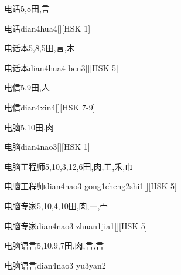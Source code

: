 \begin{Entry}{电话}{5,8}{⽥,⾔}
  \begin{Phonetics}{电话}{dian4hua4}[][HSK 1]
  \end{Phonetics}
\end{Entry}

\begin{Entry}{电话本}{5,8,5}{⽥,⾔,⽊}
  \begin{Phonetics}{电话本}{dian4hua4 ben3}[][HSK 5]
  \end{Phonetics}
\end{Entry}

\begin{Entry}{电信}{5,9}{⽥,⼈}
  \begin{Phonetics}{电信}{dian4xin4}[][HSK 7-9]
  \end{Phonetics}
\end{Entry}

\begin{Entry}{电脑}{5,10}{⽥,⾁}
  \begin{Phonetics}{电脑}{dian4nao3}[][HSK 1]
  \end{Phonetics}
\end{Entry}

\begin{Entry}{电脑工程师}{5,10,3,12,6}{⽥,⾁,⼯,⽲,⼱}
  \begin{Phonetics}{电脑工程师}{dian4nao3 gong1cheng2shi1}[][HSK 5]
  \end{Phonetics}
\end{Entry}

\begin{Entry}{电脑专家}{5,10,4,10}{⽥,⾁,⼀,⼧}
  \begin{Phonetics}{电脑专家}{dian4nao3 zhuan1jia1}[][HSK 5]
  \end{Phonetics}
\end{Entry}

\begin{Entry}{电脑语言}{5,10,9,7}{⽥,⾁,⾔,⾔}
  \begin{Phonetics}{电脑语言}{dian4nao3 yu3yan2}
  \end{Phonetics}
\end{Entry}

